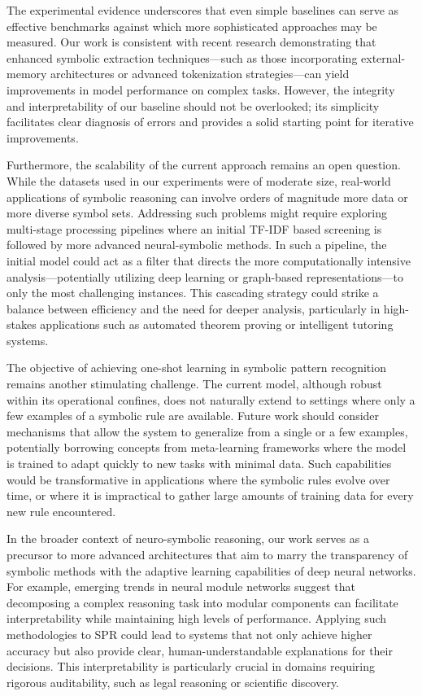\documentclass{article}
\begin{document}
The experimental evidence underscores that even simple baselines can serve as effective benchmarks against which more sophisticated approaches may be measured. Our work is consistent with recent research demonstrating that enhanced symbolic extraction techniques—such as those incorporating external-memory architectures or advanced tokenization strategies—can yield improvements in model performance on complex tasks. However, the integrity and interpretability of our baseline should not be overlooked; its simplicity facilitates clear diagnosis of errors and provides a solid starting point for iterative improvements.

Furthermore, the scalability of the current approach remains an open question. While the datasets used in our experiments were of moderate size, real-world applications of symbolic reasoning can involve orders of magnitude more data or more diverse symbol sets. Addressing such problems might require exploring multi-stage processing pipelines where an initial TF-IDF based screening is followed by more advanced neural-symbolic methods. In such a pipeline, the initial model could act as a filter that directs the more computationally intensive analysis—potentially utilizing deep learning or graph-based representations—to only the most challenging instances. This cascading strategy could strike a balance between efficiency and the need for deeper analysis, particularly in high-stakes applications such as automated theorem proving or intelligent tutoring systems.

The objective of achieving one-shot learning in symbolic pattern recognition remains another stimulating challenge. The current model, although robust within its operational confines, does not naturally extend to settings where only a few examples of a symbolic rule are available. Future work should consider mechanisms that allow the system to generalize from a single or a few examples, potentially borrowing concepts from meta-learning frameworks where the model is trained to adapt quickly to new tasks with minimal data. Such capabilities would be transformative in applications where the symbolic rules evolve over time, or where it is impractical to gather large amounts of training data for every new rule encountered.

In the broader context of neuro-symbolic reasoning, our work serves as a precursor to more advanced architectures that aim to marry the transparency of symbolic methods with the adaptive learning capabilities of deep neural networks. For example, emerging trends in neural module networks suggest that decomposing a complex reasoning task into modular components can facilitate interpretability while maintaining high levels of performance. Applying such methodologies to SPR could lead to systems that not only achieve higher accuracy but also provide clear, human-understandable explanations for their decisions. This interpretability is particularly crucial in domains requiring rigorous auditability, such as legal reasoning or scientific discovery.
\end{document}

